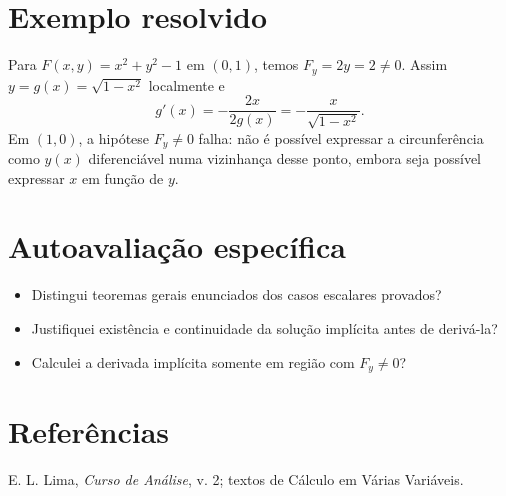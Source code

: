 \documentclass[11pt,a4paper]{article}
\begin{document}
\section{Exemplo resolvido}
Para $F(x,y)=x^2+y^2-1$ em $(0,1)$, temos $F_y=2y=2\neq0$. Assim $y=g(x)=\sqrt{1-x^2}$ localmente e
\[
g'(x)=-\frac{2x}{2g(x)}=-\frac{x}{\sqrt{1-x^2}}.
\]
Em $(1,0)$, a hipótese $F_y\ne0$ falha: não é possível expressar a circunferência como $y(x)$ diferenciável numa vizinhança desse ponto, embora seja possível expressar $x$ em função de $y$.
\section{Autoavaliação específica}
\begin{itemize}
\item Distingui teoremas gerais enunciados dos casos escalares provados?
\item Justifiquei existência e continuidade da solução implícita antes de derivá-la?
\item Calculei a derivada implícita somente em região com $F_y\ne0$?
\end{itemize}
\RubricaUFMT
\section{Referências}
E. L. Lima, \emph{Curso de Análise}, v. 2; textos de Cálculo em Várias Variáveis.
\end{document}

